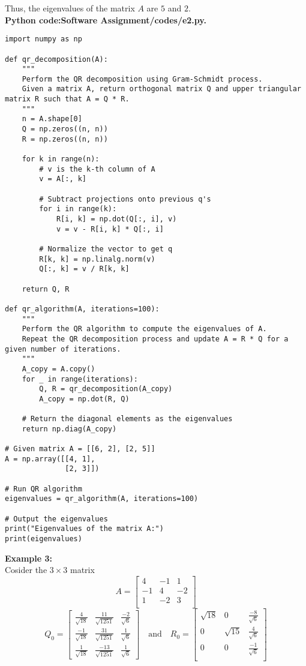 \documentclass[journal]{IEEEtran}
\begin{document}
Thus, the eigenvalues of the matrix \( A \) are \( 5 \) and \( 2 \).\\
\textbf{Python code:Software Assignment/codes/e2.py.}\\
\begin{lstlisting}
import numpy as np

def qr_decomposition(A):
    """
    Perform the QR decomposition using Gram-Schmidt process.
    Given a matrix A, return orthogonal matrix Q and upper triangular matrix R such that A = Q * R.
    """
    n = A.shape[0]
    Q = np.zeros((n, n))
    R = np.zeros((n, n))
    
    for k in range(n):
        # v is the k-th column of A
        v = A[:, k]
        
        # Subtract projections onto previous q's
        for i in range(k):
            R[i, k] = np.dot(Q[:, i], v)
            v = v - R[i, k] * Q[:, i]
        
        # Normalize the vector to get q
        R[k, k] = np.linalg.norm(v)
        Q[:, k] = v / R[k, k]
    
    return Q, R

def qr_algorithm(A, iterations=100):
    """
    Perform the QR algorithm to compute the eigenvalues of A.
    Repeat the QR decomposition process and update A = R * Q for a given number of iterations.
    """
    A_copy = A.copy()
    for _ in range(iterations):
        Q, R = qr_decomposition(A_copy)
        A_copy = np.dot(R, Q)
    
    # Return the diagonal elements as the eigenvalues
    return np.diag(A_copy)

# Given matrix A = [[6, 2], [2, 5]]
A = np.array([[4, 1],
              [2, 3]])

# Run QR algorithm
eigenvalues = qr_algorithm(A, iterations=100)

# Output the eigenvalues
print("Eigenvalues of the matrix A:")
print(eigenvalues)
\end{lstlisting}

\textbf{Example 3:}\\
Cosider the $3 \times 3$ matrix
\[
	A=\begin{bmatrix}
		4 & -1 & 1\\
		-1 & 4 & -2\\
		1 & -2 & 3\\
	\end{bmatrix}
\]
\[
Q_0 = \begin{bmatrix}
	\frac{4}{\sqrt{18}} & \frac{11}{\sqrt{1251}} & \frac{-2}{\sqrt{6}} \\
	\frac{-1}{\sqrt{18}} & \frac{31}{\sqrt{1251}} & \frac{1}{\sqrt{6}}\\
	\frac{1}{\sqrt{18}} & \frac{-13}{\sqrt{1251}} & \frac{1}{\sqrt{6}}
\end{bmatrix}
\quad \text{and} \quad
R_0 = \begin{bmatrix}
	\sqrt{18} & 0 & \frac{-8}{\sqrt{6}} \\
	0 & \sqrt{15} & \frac{4}{\sqrt{6}}\\
	0 & 0 & \frac{-1}{\sqrt{6}}\\
\end{bmatrix}
\]
\end{document}
